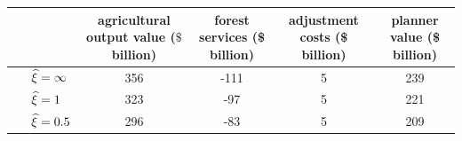 
\begin{tabular}{lcccc}
\toprule
 &\makecell[c]{agricultural \\ output value \\ ($\$$ billion)} & \makecell[c]{forest \\ services \\ (\$ billion)} & \makecell[c]{adjustment \\ costs \\ (\$ billion)} & \makecell[c]{planner \\ value \\ (\$ billion)} \\
\midrule
$\hspace{.5cm} \widehat \xi = \infty$ & 356 & -111 & 5 & 239 \\
$\hspace{.5cm} \widehat \xi = 1$ & 323 & -97 & 5 & 221 \\
$\hspace{.5cm} \widehat \xi = 0.5$ & 296 & -83 & 5 & 209 \\

\bottomrule
\end{tabular}
